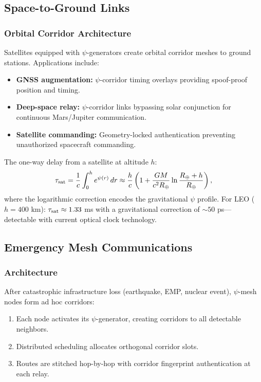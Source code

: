 \documentclass[twocolumn,superscriptaddress,prd,nofootinbib]{revtex4-2}
\begin{document}
\subsection{Space-to-Ground Links}

\subsubsection{Orbital Corridor Architecture}

Satellites equipped with $\psi$-generators create orbital corridor meshes
to ground stations.
Applications include:
\begin{itemize}
\item \textbf{GNSS augmentation:} $\psi$-corridor timing overlays
providing spoof-proof position and timing.
\item \textbf{Deep-space relay:} $\psi$-corridor links bypassing
solar conjunction for continuous Mars/Jupiter communication.
\item \textbf{Satellite commanding:} Geometry-locked authentication
preventing unauthorized spacecraft commanding.
\end{itemize}

The one-way delay from a satellite at altitude $h$:
\begin{equation}
\tau_{\rm sat} = \frac{1}{c}\int_0^h e^{\psi(r)}\,dr
\approx \frac{h}{c}\left(1 + \frac{GM}{c^2 R_\oplus}\ln\frac{R_\oplus + h}{R_\oplus}\right),
\label{eq:sat-delay}
\end{equation}
where the logarithmic correction encodes the gravitational $\psi$ profile.
For LEO ($h = 400$ km): $\tau_{\rm sat} \approx 1.33$ ms with a
gravitational correction of $\sim 50$ ps---detectable with current
optical clock technology.

\subsection{Emergency Mesh Communications}

\subsubsection{Architecture}

After catastrophic infrastructure loss (earthquake, EMP, nuclear event),
$\psi$-mesh nodes form ad hoc corridors:
\begin{enumerate}
\item Each node activates its $\psi$-generator, creating corridors to
all detectable neighbors.
\item Distributed scheduling allocates orthogonal corridor slots.
\item Routes are stitched hop-by-hop with corridor fingerprint
authentication at each relay.
\end{enumerate}
\end{document}
